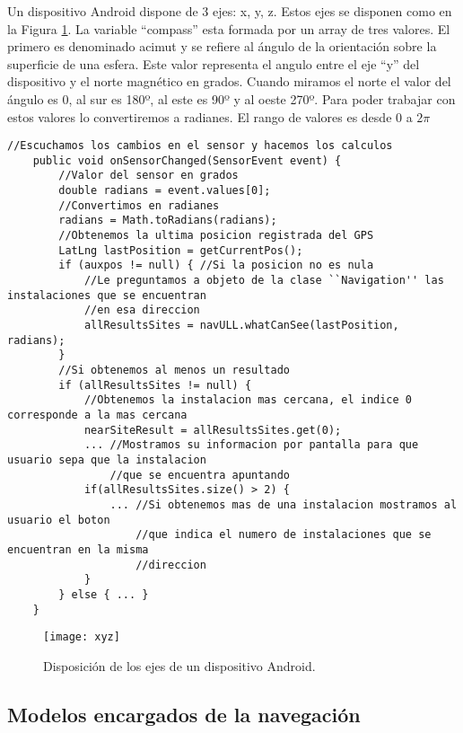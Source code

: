 Un dispositivo Android dispone de 3 ejes: x, y, z. Estos ejes se disponen como en la Figura \ref{fig:xyz}. La variable ``compass'' esta formada por un array de tres valores. El primero es denominado acimut y se refiere al ángulo de la orientación sobre la superficie de una esfera. Este valor representa el angulo entre el eje ``y'' del dispositivo y el norte magnético en grados. Cuando miramos el norte el valor del ángulo es 0, al sur es 180º, al este es 90º y al oeste 270º. Para poder trabajar con estos valores lo convertiremos a radianes.  El rango de valores es desde $0$ a $2\pi$


\begin{lstlisting}[caption={Código que se ejecuta cada vez que se registra un cambio en el sensor que calcula la orientacion.}, label={lst:orientacionL}]
    //Escuchamos los cambios en el sensor y hacemos los calculos
    public void onSensorChanged(SensorEvent event) {
        //Valor del sensor en grados
        double radians = event.values[0]; 
        //Convertimos en radianes
        radians = Math.toRadians(radians);
        //Obtenemos la ultima posicion registrada del GPS
        LatLng lastPosition = getCurrentPos();
        if (auxpos != null) { //Si la posicion no es nula
            //Le preguntamos a objeto de la clase ``Navigation'' las instalaciones que se encuentran
            //en esa direccion
            allResultsSites = navULL.whatCanSee(lastPosition, radians);
        }
        //Si obtenemos al menos un resultado
        if (allResultsSites != null) {
            //Obtenemos la instalacion mas cercana, el indice 0 corresponde a la mas cercana
            nearSiteResult = allResultsSites.get(0);
            ... //Mostramos su informacion por pantalla para que usuario sepa que la instalacion  
                //que se encuentra apuntando
            if(allResultsSites.size() > 2) {
                ... //Si obtenemos mas de una instalacion mostramos al usuario el boton
                    //que indica el numero de instalaciones que se encuentran en la misma
                    //direccion 
            }
        } else { ... }
    } 
\end{lstlisting}

\begin{figure}[h]
    \centering
    \texttt{[image: xyz]}
    \caption{Disposición de los ejes de un dispositivo Android.}
    \label{fig:xyz}
\end{figure}    

\subsection{Modelos encargados de la navegación}

